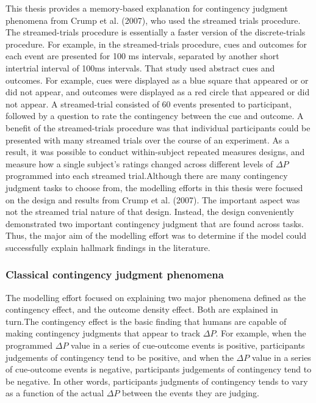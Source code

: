 \documentclass[
  english,
  man,floatsintext]{apa6}
\begin{document}
This thesis provides a memory-based explanation for contingency judgment phenomena from Crump et al. (2007), who used the streamed trials procedure. The streamed-trials procedure is essentially a faster version of the discrete-trials procedure. For example, in the streamed-trials procedure, cues and outcomes for each event are presented for 100 ms intervals, separated by another short intertrial interval of 100ms intervals. That study used abstract cues and outcomes. For example, cues were displayed as a blue square that appeared or or did not appear, and outcomes were displayed as a red circle that appeared or did not appear. A streamed-trial consisted of 60 events presented to participant, followed by a question to rate the contingency between the cue and outcome. A benefit of the streamed-trials procedure was that individual participants could be presented with many streamed trials over the course of an experiment. As a result, it was possible to conduct within-subject repeated measures designs, and measure how a single subject's ratings changed across different levels of \(\Delta P\) programmed into each streamed trial.Although there are many contingency judgment tasks to choose from, the modelling efforts in this thesis were focused on the design and results from Crump et al. (2007). The important aspect was not the streamed trial nature of that design. Instead, the design conveniently demonstrated two important contingency judgment that are found across tasks. Thus, the major aim of the modelling effort was to determine if the model could successfully explain hallmark findings in the literature.

\hypertarget{classical-contingency-judgment-phenomena}{%
\subsubsection{Classical contingency judgment phenomena}\label{classical-contingency-judgment-phenomena}}

The modelling effort focused on explaining two major phenomena defined as the contingency effect, and the outcome density effect. Both are explained in turn.The contingency effect is the basic finding that humans are capable of making contingency judgments that appear to track \(\Delta P\). For example, when the programmed \(\Delta P\) value in a series of cue-outcome events is positive, participants judgements of contingency tend to be positive, and when the \(\Delta P\) value in a series of cue-outcome events is negative, participants judgements of contingency tend to be negative. In other words, participants judgments of contingency tends to vary as a function of the actual \(\Delta P\) between the events they are judging.
\end{document}
